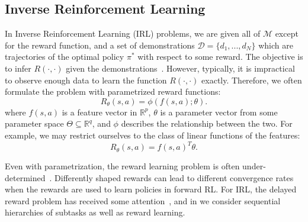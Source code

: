 \subsection{Inverse Reinforcement Learning}
In Inverse Reinforcement Learning (IRL) problems, we are given all of $\mathcal{M}$ except for the reward function, and a set of demonstrations $\mathcal{D}=\{d_1,...,d_N\}$ which are trajectories of the optimal policy $\pi^*$ with respect to some reward.
The objective is to infer $R(\cdot,\cdot)$ given the demonstrations~\cite{DBLP:conf/icml/NgHR99,DBLP:conf/aaai/ZiebartMBD08, coates2008learning}.
However, typically, it is impractical to observe enough data to learn the function $R(\cdot,\cdot)$ exactly.
Therefore, we often formulate the problem with parametrized reward functions:
\[
R_{\theta}(s,a) = \phi(f(s,a);\theta).
\]
where $f(s,a)$ is a feature vector in $\mathbb{R}^p$, $\theta$ is a parameter vector from some parameter space $\Theta \subseteq \mathbb{R}^q$, and $\phi$ describes the relationship between the two.
For example, we may restrict ourselves to the class of linear functions of the features:
\[
R_{\theta}(s,a) = f(s,a)^T\theta.
\]

Even with parametrization, the reward learning problem is often under-determined~\cite{DBLP:conf/icml/NgHR99}.
Differently shaped rewards can lead to different convergence rates when the rewards are used to learn policies in forward RL.
For IRL, the delayed reward problem has received some attention~\cite{DBLP:conf/ijcai/MacGlashanL15, DBLP:conf/aaai/JudahFTG14}, and in \hirl we consider sequential hierarchies of subtasks as well as reward learning.

\iffalse
\subsection{Memory in ``Forward'' RL}
The problem that we study is highly related to the use of memory states in RL problems.
The addition of memory states is an increasingly popular solution to partial observability in forward RL problems~\cite{DBLP:journals/corr/ZhangLMFA15, DBLP:journals/corr/HeessHLS15}. The empirical success of these techniques is significant enough that it is argued that RL with memory networks sidesteps many of the known hardness of POMDPs~\cite{DBLP:journals/corr/ZhangLMFA15}.
Some of these ideas have been in the RL and Robotics communities for many years (e.g., \cite{DBLP:conf/nips/Bakker01,DBLP:journals/neco/CleeremansSM89,DBLP:journals/neco/Pearlmutter89}).
To the best of our knowledge, there are few examples of such approaches in recent Inverse Reinforcement Learning literature.
\fi
